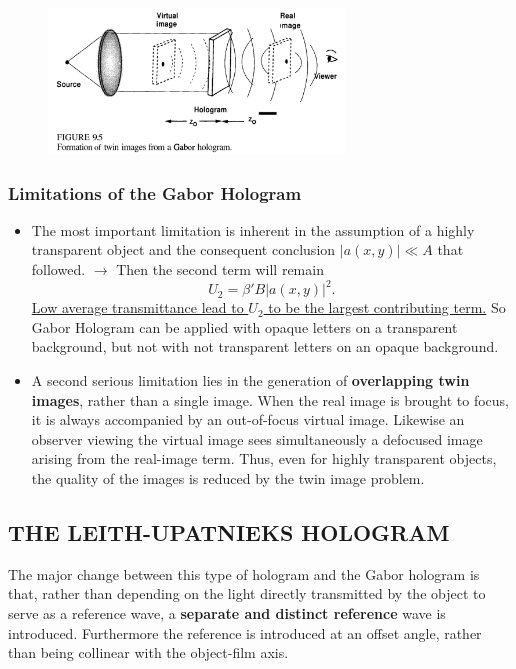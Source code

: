 \documentclass[en,hazy,device=normal,blue,14pt]{elegantnote}
\begin{document}
\begin{figure}[htbp]
  \centering
  \includegraphics[width=0.7\textwidth]{5.png}
\end{figure}

\subsubsection{Limitations of the Gabor Hologram}
\begin{itemize}
  \item The most important limitation is inherent in the assumption of a highly transparent object and the consequent conclusion $\left| {a\left( {x,y} \right)} \right| \ll A$ that followed.
  $\to$ Then the second term will remain 
  \begin{equation}
    U_2=\beta'B{\left| {a\left( {x,y} \right)} \right|^2}.
  \end{equation}
  \uline{Low average transmittance lead to $U_2$ to be the largest contributing term.} So Gabor Hologram can be applied with opaque letters on a transparent background, but not with not transparent letters on an opaque background. 
  \item A second serious limitation lies in the generation of \textbf{overlapping twin images}, rather than a single image. When the real image is brought to focus, it is always accompanied by an out-of-focus virtual image. Likewise an observer viewing the virtual image sees simultaneously a defocused image arising from the real-image term. Thus, even for highly transparent objects, the quality of the images is reduced by the twin image problem.
\end{itemize}

\subsection{THE LEITH-UPATNIEKS HOLOGRAM}
The major change between this type of hologram and the Gabor hologram is that, rather than depending on the light directly transmitted by the object to serve as a reference wave, a \textbf{separate and distinct reference} wave is introduced.
Furthermore the reference is introduced at an
offset angle, rather than being collinear with the object-film axis.
\end{document}
